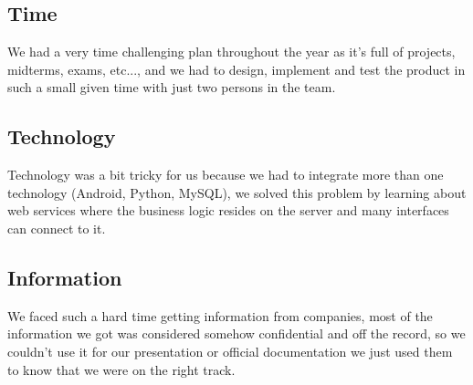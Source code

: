 \subsection{Time}
	We had a very time challenging plan throughout the year as it's full of projects, midterms, exams, etc..., and we had to design, implement and test the product in such a small given time with just two persons in the team.
\subsection{Technology}
	Technology was a bit tricky for us because we had to integrate more than one technology (Android, Python, MySQL), we solved this problem by learning about web services where the business logic resides on the server and many interfaces can connect to it. 
\subsection{Information}
	We faced such a hard time getting information from companies, most of the information we got was considered somehow confidential and off the record, so we couldn't use it for our presentation or official documentation we just used them to know that we were on the right track.